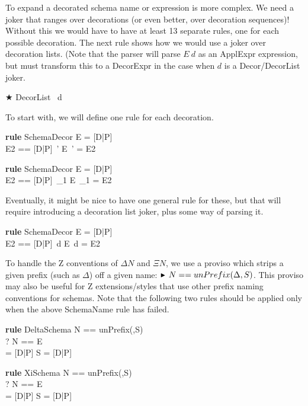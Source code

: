 \documentclass{article}
\newenvironment{zedrule}[1]{\par\textbf{rule }#1\vspace{-2ex}\infrule}{\endinfrule}
\newcommand{\derives}{\derive{}}
\newenvironment{zedjoker}[1]{\par$\bigstar$ #1\ }{}
\newcommand{\proviso}{\raisebox{0.5ex}{${}_{\blacktriangleright}\ $}}%
\begin{document}
To expand a decorated schema name or expression is more complex.
We need a joker that ranges over decorations 
(or even better, over decoration sequences)!
Without this we would have to have at least 13 separate rules,
one for each possible decoration.  The next rule shows
how we would use a joker over decoration lists.
(Note that the parser will parse $E~d$ as an ApplExpr
expression, but must transform this to a DecorExpr in the
case when $d$ is a Decor/DecorList joker.

\begin{zedjoker}{DecorList} d \end{zedjoker}

To start with, we will define one rule for each decoration.

\begin{zedrule}{SchemaDecor}
  E = [D|P] \\
 \proviso E2 == [D|P]~'
\derives
  E~' = E2
\end{zedrule}

\begin{zedrule}{SchemaDecor}
  E = [D|P] \\
  \proviso E2 == [D|P]~\_1
\derives
  E~\_1 = E2
\end{zedrule}

Eventually, it might be nice to have one general
rule for these, but that will require introducing
a decoration list joker, plus some way of parsing
it.
\begin{zedrule}{SchemaDecor}
  E = [D|P] \\
  \proviso E2 == [D|P]~d
\derives
  E~d = E2
\end{zedrule}

To handle the Z conventions of $\Delta N$ and $\Xi N$,
we use a proviso which strips a given prefix (such as $\Delta$)
off a given name: $\proviso N == unPrefix(\Delta,S)$.
This proviso may also be useful for Z extensions/styles that use
other prefix naming conventions for schemas.
Note that the following two rules should be applied
only when the above SchemaName rule has failed.

\begin{zedrule}{DeltaSchema}
  \proviso N == unPrefix(\Delta,S) \\
  \proviso? N == E \\
  [E; E~'] = [D|P]
\derives
  S = [D|P]
\end{zedrule}

\begin{zedrule}{XiSchema}
  \proviso N == unPrefix(\Xi,S) \\
  \proviso? N == E \\
  [E; E~'| \theta E = \theta E~'] = [D|P]
\derives
  S = [D|P]
\end{zedrule}
\end{document}
